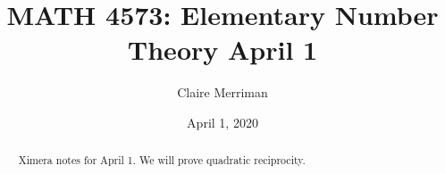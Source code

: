 \documentclass{xourse}
\title{MATH 4573: Elementary Number Theory April 1}
\author{Claire Merriman}
\date{April 1, 2020}
\begin{document}
  
\begin{abstract} %
Ximera notes for April 1. We will prove quadratic reciprocity.
\end{abstract}  
\maketitle 
 
 
\end{document}
